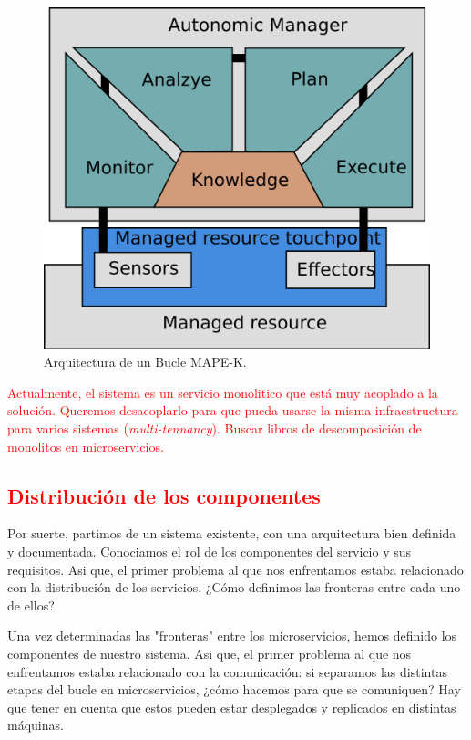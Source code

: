 \begin{figure}[htb]
  \centering
  \includegraphics[scale=0.6]{01_introduccion/images/bucle-mape-k}
  \caption[Arquitectura de un Bucle MAPE-K.]{Arquitectura de un Bucle MAPE-K.\footnotemark}
  \label{fig:bucle-mapek2}
\end{figure}


\textcolor{red}{Actualmente, el sistema es un servicio monolitico que está muy acoplado a la solución. Queremos desacoplarlo para que pueda usarse la misma infraestructura para varios sistemas (\emph{multi-tennancy}). Buscar libros de descomposición de monolitos en microservicios.}

\subsection{\textcolor{red}{Distribución de los componentes}}

Por suerte, partimos de un sistema existente, con una arquitectura bien definida y documentada. Conociamos el rol de los componentes del servicio y sus requisitos. Asi que, el primer problema al que nos enfrentamos estaba relacionado con la distribución de los servicios. ¿Cómo definimos las fronteras entre cada uno de ellos?

Una vez determinadas las "fronteras" entre los microservicios, hemos definido los componentes de nuestro sistema. Asi que, el primer problema al que nos enfrentamos estaba relacionado con la comunicación: si separamos las distintas etapas del bucle en microservicios, ¿cómo hacemos para que se comuniquen? Hay que tener en cuenta que estos pueden estar desplegados y replicados en distintas máquinas.

